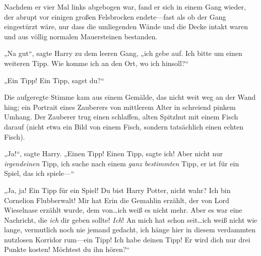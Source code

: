 Nachdem er vier Mal links abgebogen war, fand er sich in einem Gang wieder, der abrupt vor einigen großen Felsbrocken endete—fast als ob der Gang eingestürzt wäre, nur dass die umliegenden Wände und die Decke intakt waren und aus völlig normalen Mauersteinen bestanden.

„Na gut“, sagte Harry zu dem leeren Gang, „ich gebe auf. Ich bitte um einen weiteren Tipp. Wie komme ich an den Ort, wo ich hinsoll?“

„Ein Tipp! Ein Tipp, sagst du?“

Die aufgeregte Stimme kam aus einem Gemälde, das nicht weit weg an der Wand hing; ein Portrait eines Zauberers von mittlerem Alter in schreiend pinkem Umhang. Der Zauberer trug einen schlaffen, alten Spitzhut mit einem Fisch darauf (nicht etwa ein Bild von einem Fisch, sondern tatsächlich einen echten Fisch).

„Ja!“, sagte Harry. „Einen Tipp! Einen Tipp, sagte ich! Aber nicht nur \emph{irgendeinen} Tipp, ich suche nach einem \emph{ganz bestimmten} Tipp, er ist für ein Spiel, das ich spiele—“

„Ja, ja! Ein Tipp für ein Spiel! Du bist Harry Potter, nicht wahr? Ich bin Cornelion Flubberwalt! Mir hat Erin die Gemahlin erzählt, der von Lord Wieselnase erzählt wurde, dem von…ich weiß es nicht mehr. Aber es war eine Nachricht, die \emph{ich} dir geben sollte! \emph{Ich}! An mich hat schon seit…ich weiß nicht wie lange, vermutlich noch nie jemand gedacht, ich hänge hier in diesem verdammten nutzlosen Korridor rum—ein Tipp! Ich habe deinen Tipp! Er wird dich nur drei Punkte kosten! Möchtest du ihn hören?“

